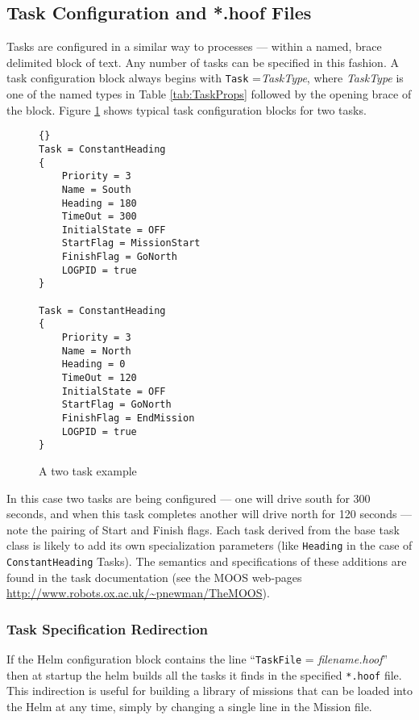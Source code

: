 \documentclass[a4paper,10pt]{article}
\newcommand{\Code}[1]{\texttt{#1} }
\newcommand{\code}[1]{\Code{#1} }
\begin{document}
\subsection{Task Configuration and *.hoof Files}
Tasks are configured in a similar way to processes --- within a
named, brace delimited block of text. Any number of tasks can be
specified in this fashion. A task configuration block always
begins with \code{Task}={\it{TaskType}}, where {\it{TaskType}} is
one of the named types in Table \ref{tab:TaskProps} followed
by the opening brace of the block. Figure \ref{fig:TaskSpec} shows
typical task configuration blocks for two tasks.
%
\begin{figure}[ht]
\begin{lstlisting}[]{}
Task = ConstantHeading
{
    Priority = 3
    Name = South
    Heading = 180
    TimeOut = 300
    InitialState = OFF
    StartFlag = MissionStart
    FinishFlag = GoNorth
    LOGPID = true
}

Task = ConstantHeading
{
    Priority = 3
    Name = North
    Heading = 0
    TimeOut = 120
    InitialState = OFF
    StartFlag = GoNorth
    FinishFlag = EndMission
    LOGPID = true
}
\end{lstlisting}
\caption{A two task example}
\label{fig:TaskSpec}
\end{figure}
%
In this case two tasks are being configured --- one will drive south
for 300 seconds, and when this task completes another will drive
north for 120 seconds --- note the pairing of Start and Finish
flags. Each task derived from the base task class is likely to add
its own specialization parameters (like \code{Heading} in the case
of \code{ConstantHeading} Tasks). The semantics and specifications
of these additions are found in the task documentation (see the
MOOS web-pages \url{http://www.robots.ox.ac.uk/~pnewman/TheMOOS}).


\subsubsection{Task Specification Redirection} If the Helm
configuration block contains the line ``\code{TaskFile}=
{\it{filename.hoof}}'' then at startup the helm builds all the
tasks it finds in the specified \code{*.hoof} file. This
indirection is useful for building a library of missions that can
be loaded into the Helm at any time, simply by changing a single
line in the Mission file.
\end{document}
